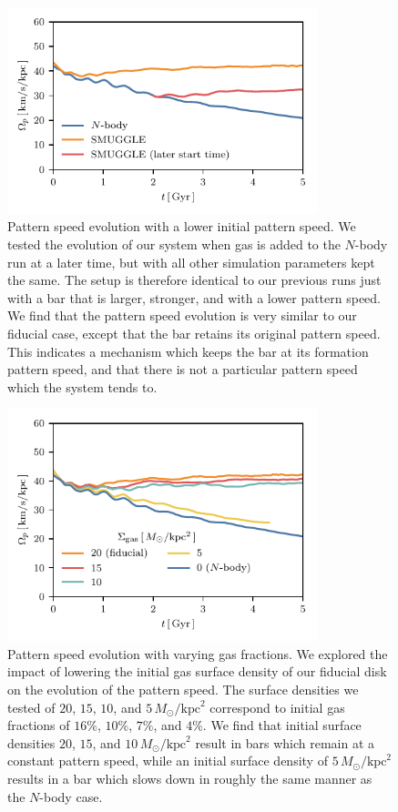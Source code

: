 \documentclass[fleqn,usenatbib]{mnras}
\newcommand{\Nbody}{$N$-body}
\newcommand{\Msun}{\ensuremath{M_{\odot}}}
\begin{document}
\begin{figure}
    \centering
    \includegraphics[width=9cm]{fig/ps_late_start.pdf}
    \caption{Pattern speed evolution with a lower initial pattern speed. We
    tested the evolution of our system when gas is added to the \Nbody{} run at
    a later time, but with all other simulation parameters kept the same. The
    setup is therefore identical to our previous runs just with a bar that is
    larger, stronger, and with a lower pattern speed. We find that the pattern
    speed evolution is very similar to our fiducial case, except that the bar
    retains its original pattern speed. This indicates a mechanism which keeps
    the bar at its formation pattern speed, and that there is not a particular
    pattern speed which the system tends to.}
    \label{fig:snap700}
\end{figure}

\begin{figure}
    \centering
    \includegraphics[width=9cm]{fig/ps_fgas.pdf}
    \caption{Pattern speed evolution with varying gas fractions. We explored the
    impact of lowering the initial gas surface density of our fiducial disk on
    the evolution of the pattern speed. The surface densities we tested of $20$,
    $15$, $10$, and $5\,\Msun/\textrm{kpc}^2$ correspond to initial gas
    fractions of $16\%$, $10\%$, $7\%$, and $4\%$. We find that initial surface
    densities $20$, $15$, and $10\,\Msun/\textrm{kpc}^2$ result in bars which
    remain at a constant pattern speed, while an initial surface density of
    $5\,\Msun/\textrm{kpc}^2$ results in a bar which slows down in roughly the
    same manner as the \Nbody{} case.}
    \label{fig:fgas}
\end{figure}
\end{document}

